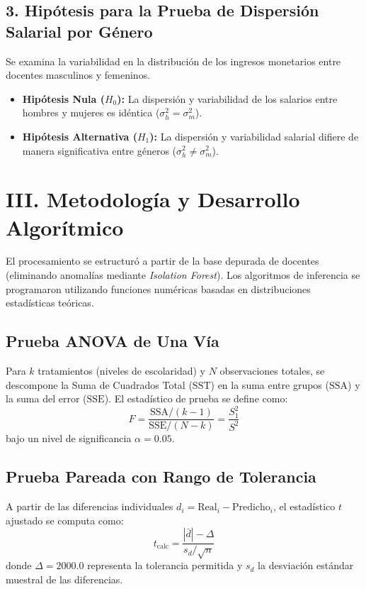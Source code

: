 \documentclass[10pt,twocolumn,a4paper]{article}
\begin{document}
\subsection{3. Hipótesis para la Prueba de Dispersión Salarial por Género}
Se examina la variabilidad en la distribución de los ingresos monetarios entre docentes masculinos y femeninos.
\begin{itemize}
    \item \textbf{Hipótesis Nula ($H_0$):} La dispersión y variabilidad de los salarios entre hombres y mujeres es idéntica ($\sigma_h^2 = \sigma_m^2$).
    \item \textbf{Hipótesis Alternativa ($H_1$):} La dispersión y variabilidad salarial difiere de manera significativa entre géneros ($\sigma_h^2 \neq \sigma_m^2$).
\end{itemize}

\section{III. Metodología y Desarrollo Algorítmico}
El procesamiento se estructuró a partir de la base depurada de docentes (eliminando anomalías mediante \textit{Isolation Forest}). Los algoritmos de inferencia se programaron utilizando funciones numéricas basadas en distribuciones estadísticas teóricas.

\subsection{Prueba ANOVA de Una Vía}
Para $k$ tratamientos (niveles de escolaridad) y $N$ observaciones totales, se descompone la Suma de Cuadrados Total ($\text{SST}$) en la suma entre grupos ($\text{SSA}$) y la suma del error ($\text{SSE}$). El estadístico de prueba se define como:
\begin{equation}
    F = \frac{\text{SSA} / (k - 1)}{\text{SSE} / (N - k)} = \frac{S_1^2}{S^2}
\end{equation}
bajo un nivel de significancia $\alpha = 0.05$.

\subsection{Prueba Pareada con Rango de Tolerancia}
A partir de las diferencias individuales $d_i = \text{Real}_i - \text{Predicho}_i$, el estadístico $t$ ajustado se computa como:
\begin{equation}
    t_{\text{calc}} = \frac{|\bar{d}| - \Delta}{s_d / \sqrt{n}}
\end{equation}
donde $\Delta = 2000.0$ representa la tolerancia permitida y $s_d$ la desviación estándar muestral de las diferencias.
\end{document}
